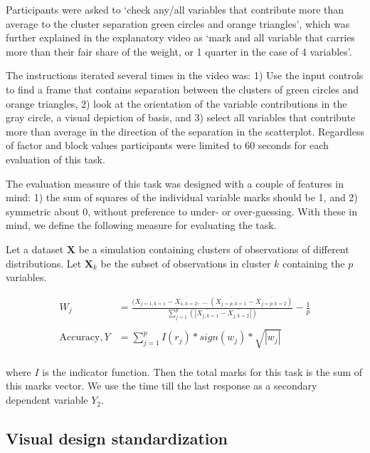 \documentclass{template/monashthesis}
\begin{document}
Participants were asked to `check any/all variables that contribute more than average to the cluster separation green circles and orange triangles', which was further explained in the explanatory video as `mark and all variable that carries more than their fair share of the weight, or 1 quarter in the case of 4 variables'.

The instructions iterated several times in the video was: 1) Use the input controls to find a frame that contains separation between the clusters of green circles and orange triangles, 2) look at the orientation of the variable contributions in the gray circle, a visual depiction of basis, and 3) select all variables that contribute more than average in the direction of the separation in the scatterplot. Regardless of factor and block values participants were limited to 60 seconds for each evaluation of this task.

The evaluation measure of this task was designed with a couple of features in mind: 1) the sum of squares of the individual variable marks should be 1, and 2) symmetric about 0, without preference to under- or over-guessing. With these in mind, we define the following measure for evaluating the task.

Let a dataset \(\textbf{X}\) be a simulation containing clusters of observations of different distributions. Let \(\textbf{X}_k\) be the subset of observations in cluster \(k\) containing the \(p\) variables.

\begin{align*}
W_{j} &=\frac
{(\overline{X_{j=1, k=1}} - \overline{X_{1, k=2}}, ~...~
(\overline{X_{j=p, k=1}} - \overline{X_{j=p, k=2}})}
{\sum_{j=1}^{p}(|\overline{X_{j,k=1}} - \overline{X_{j,k=2}}|)}
- \frac{1}{p} \\
\\
\text{Accuracy}, Y &= \sum_{j=1}^{p}I(r_j) * sign(w_j) * \sqrt{|w_j|}  \\
\end{align*}

where \(I\) is the indicator function. Then the total marks for this task is the sum of this marks vector. We use the time till the last response as a secondary dependent variable \(Y_2\).

\hypertarget{sec:standardization}{%
\subsection{Visual design standardization}\label{sec:standardization}}
\end{document}
